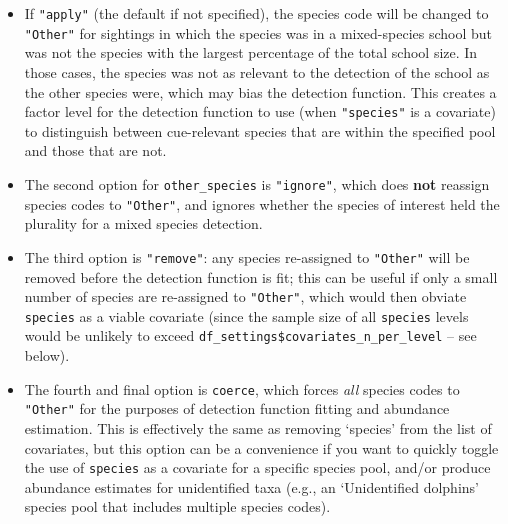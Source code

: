 \documentclass[
]{book}
\providecommand{\tightlist}{%
  \setlength{\itemsep}{0pt}\setlength{\parskip}{0pt}}
\begin{document}
\begin{itemize}
  \begin{itemize}
  \tightlist
  \item
    If \texttt{"apply"} (the default if not specified), the species code will be changed to \texttt{"Other"} for sightings in which the species was in a mixed-species school but was not the species with the largest percentage of the total school size. In those cases, the species was not as relevant to the detection of the school as the other species were, which may bias the detection function. This creates a factor level for the detection function to use (when \texttt{"species"} is a covariate) to distinguish between cue-relevant species that are within the specified pool and those that are not.
  \item
    The second option for \texttt{other\_species} is \texttt{"ignore"}, which does \textbf{not} reassign species codes to \texttt{"Other"}, and ignores whether the species of interest held the plurality for a mixed species detection.
  \item
    The third option is \texttt{"remove"}: any species re-assigned to \texttt{"Other"} will be removed before the detection function is fit; this can be useful if only a small number of species are re-assigned to \texttt{"Other"}, which would then obviate \texttt{species} as a viable covariate (since the sample size of all \texttt{species} levels would be unlikely to exceed \texttt{df\_settings\$covariates\_n\_per\_level} -- see below). 
  \item
    The fourth and final option is \texttt{coerce}, which forces \emph{all} species codes to \texttt{"Other"} for the purposes of detection function fitting and abundance estimation. This is effectively the same as removing `species' from the list of covariates, but this option can be a convenience if you want to quickly toggle the use of \texttt{species} as a covariate for a specific species pool, and/or produce abundance estimates for unidentified taxa (e.g., an `Unidentified dolphins' species pool that includes multiple species codes).
  \end{itemize}
\end{itemize}

~
\end{document}
